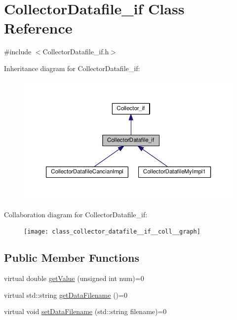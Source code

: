 \hypertarget{class_collector_datafile__if}{\section{Collector\-Datafile\-\_\-if Class Reference}
\label{class_collector_datafile__if}
}


{\ttfamily \#include $<$Collector\-Datafile\-\_\-if.\-h$>$}



Inheritance diagram for Collector\-Datafile\-\_\-if\-:\nopagebreak
\begin{figure}[H]
\begin{center}
\leavevmode
\includegraphics[width=350pt]{class_collector_datafile__if__inherit__graph}
\end{center}
\end{figure}


Collaboration diagram for Collector\-Datafile\-\_\-if\-:\nopagebreak
\begin{figure}[H]
\begin{center}
\leavevmode
\texttt{[image: class\_collector\_datafile\_\_if\_\_coll\_\_graph]}
\end{center}
\end{figure}
\subsection*{Public Member Functions}
\begin{DoxyCompactItemize}
\item 
virtual double \hyperlink{class_collector_datafile__if_aa790efe68dfa16cebd66b481bbda8411}{get\-Value} (unsigned int num)=0
\item 
virtual std\-::string \hyperlink{class_collector_datafile__if_a81d109f34c25f5295f76ba13f4234a3c}{get\-Data\-Filename} ()=0
\item 
virtual void \hyperlink{class_collector_datafile__if_ab826bbf5472a5cfdbf2f2c30273da8eb}{set\-Data\-Filename} (std\-::string filename)=0
\end{DoxyCompactItemize}


